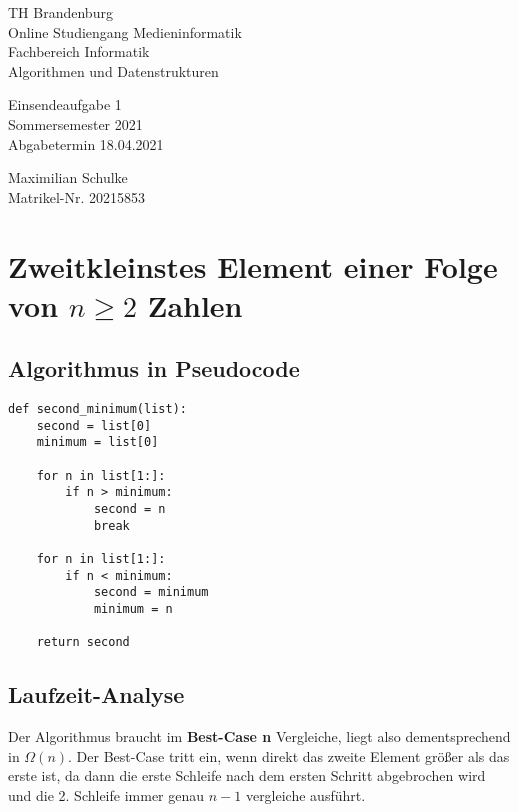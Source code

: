 \documentclass{article}
\begin{document}
\begin{titlepage}
	\begin{flushleft}
		TH Brandenburg \\
		Online Studiengang Medieninformatik \\
		Fachbereich Informatik \\
		Algorithmen und Datenstrukturen
	\end{flushleft}

	\vfill

	\begin{center}
		\Large{Einsendeaufgabe 1}\\[0.5em]
		\large{Sommersemester 2021}\\[0.25em]
		\large{Abgabetermin 18.04.2021}
	\end{center}

	\vfill

	\begin{flushright}
		Maximilian Schulke \\
		Matrikel-Nr. 20215853
	\end{flushright}
\end{titlepage}

\newpage

\section{Zweitkleinstes Element einer Folge  von $n \geq 2$ Zahlen}

\subsection{Algorithmus in Pseudocode}

\begin{lstlisting}
def second_minimum(list):
    second = list[0]
    minimum = list[0]

    for n in list[1:]:
        if n > minimum:
            second = n
            break

    for n in list[1:]:
        if n < minimum:
            second = minimum
            minimum = n

    return second
\end{lstlisting}

\subsection{Laufzeit-Analyse}

Der Algorithmus braucht im \textbf{Best-Case n} Vergleiche, liegt also dementsprechend in $\Omega(n)$. Der Best-Case tritt ein,
wenn direkt das zweite Element größer als das erste ist, da dann die erste Schleife nach dem ersten Schritt abgebrochen wird und
die 2. Schleife immer genau $n - 1$ vergleiche ausführt.
\end{document}
